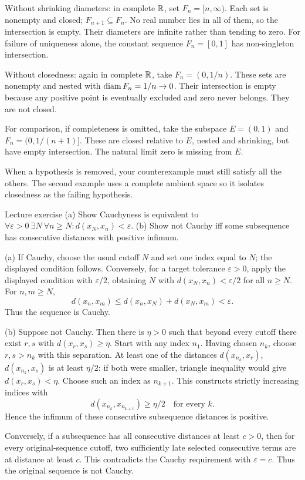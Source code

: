 \begin{answer}
Without shrinking diameters: in complete $\mathbb R$, set $F_n=[n,\infty)$. Each set is nonempty and closed; $F_{n+1}\subseteq F_n$. No real number lies in all of them, so the intersection is empty. Their diameters are infinite rather than tending to zero. For failure of uniqueness alone, the constant sequence $F_n=[0,1]$ has non-singleton intersection.

Without closedness: again in complete $\mathbb R$, take $F_n=(0,1/n)$. These sets are nonempty and nested with $\operatorname{diam} F_n=1/n\to0$. Their intersection is empty because any positive point is eventually excluded and zero never belongs. They are not closed.

For comparison, if completeness is omitted, take the subspace $E=(0,1)$ and $F_n=(0,1/(n+1)]$. These are closed relative to $E$, nested and shrinking, but have empty intersection. The natural limit zero is missing from $E$.
\end{answer}
\begin{tip}
When a hypothesis is removed, your counterexample must still satisfy all the others. The second example uses a complete ambient space so it isolates closedness as the failing hypothesis.
\end{tip}
\begin{exam}{Lecture exercise}
(a) Show Cauchyness is equivalent to $\forall\varepsilon>0\ \exists N\ \forall n\ge N:d(x_N,x_n)<\varepsilon$. (b) Show not Cauchy iff some subsequence has consecutive distances with positive infimum.
\end{exam}
\begin{answer}
(a) If Cauchy, choose the usual cutoff $N$ and set one index equal to $N$; the displayed condition follows. Conversely, for a target tolerance $\varepsilon>0$, apply the displayed condition with $\varepsilon/2$, obtaining $N$ with $d(x_N,x_n)<\varepsilon/2$ for all $n\ge N$. For $n,m\ge N$,
\[d(x_n,x_m)\le d(x_n,x_N)+d(x_N,x_m)<\varepsilon.\]
Thus the sequence is Cauchy.

(b) Suppose not Cauchy. Then there is $\eta>0$ such that beyond every cutoff there exist $r,s$ with $d(x_r,x_s)\ge\eta$. Start with any index $n_1$. Having chosen $n_k$, choose $r,s>n_k$ with this separation. At least one of the distances $d(x_{n_k},x_r)$, $d(x_{n_k},x_s)$ is at least $\eta/2$: if both were smaller, triangle inequality would give $d(x_r,x_s)<\eta$. Choose such an index as $n_{k+1}$. This constructs strictly increasing indices with
\[d(x_{n_k},x_{n_{k+1}})\ge\eta/2\quad\text{for every }k.\]
Hence the infimum of these consecutive subsequence distances is positive.

Conversely, if a subsequence has all consecutive distances at least $c>0$, then for every original-sequence cutoff, two sufficiently late selected consecutive terms are at distance at least $c$. This contradicts the Cauchy requirement with $\varepsilon=c$. Thus the original sequence is not Cauchy.
\end{answer}
